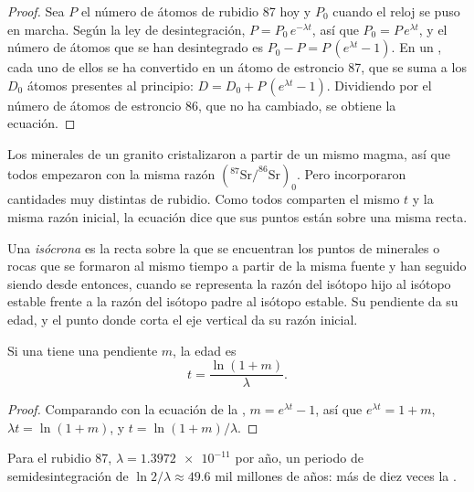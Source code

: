 \begin{proof}
Sea $P$ el número de átomos de rubidio 87 hoy y $P_0$ cuando el reloj se puso
en marcha. Según la ley de desintegración, $P = P_0\,e^{-\lambda t}$, así que $P_0 = P\,e^{\lambda t}$,
y el número de átomos que se han desintegrado es $P_0 - P = P\,(e^{\lambda t}-1)$.
En un , cada uno de ellos se ha convertido en un átomo de
estroncio 87, que se suma a los $D_0$ átomos presentes al principio: $D = D_0 + P\,(e^{\lambda
t}-1)$. Dividiendo por el número de átomos de estroncio 86, que no ha
cambiado, se obtiene la ecuación.
\end{proof}

Los minerales de un granito cristalizaron a partir de un mismo magma, así que
todos empezaron con la misma razón $(^{87}\mathrm{Sr}/^{86}\mathrm{Sr})_0$.
Pero incorporaron cantidades muy distintas de rubidio. Como todos comparten el
mismo $t$ y la misma razón inicial, la ecuación dice que sus puntos están
sobre una misma recta.

\begin{definition}[Isócrona]\label{def:g12:age-of-the-earth:isochron}
Una \emph{isócrona} es la recta sobre la que se
encuentran los puntos de minerales o rocas que se formaron al mismo tiempo a
partir de la misma fuente y han seguido siendo  desde
entonces, cuando se representa la razón del isótopo hijo al isótopo estable
frente a la razón del isótopo padre al isótopo estable. Su pendiente da su
edad, y el punto donde corta el eje vertical da su razón inicial.
\end{definition}

\begin{proposition}\label{prop:g12:age-of-the-earth:slope}
Si una  tiene una pendiente $m$, la edad es
\[
  t = \frac{\ln(1+m)}{\lambda}.
\]
\end{proposition}

\begin{proof}
Comparando con la ecuación de la , $m = e^{\lambda t} - 1$, así que
$e^{\lambda t} = 1 + m$, $\lambda t = \ln(1+m)$, y $t = \ln(1+m)/\lambda$.
\end{proof}

Para el rubidio 87, $\lambda = \num{1.3972e-11}$ por año, un periodo de
semidesintegración de
$\ln 2/\lambda \approx 49.6$ mil millones de años: más de diez veces la .

